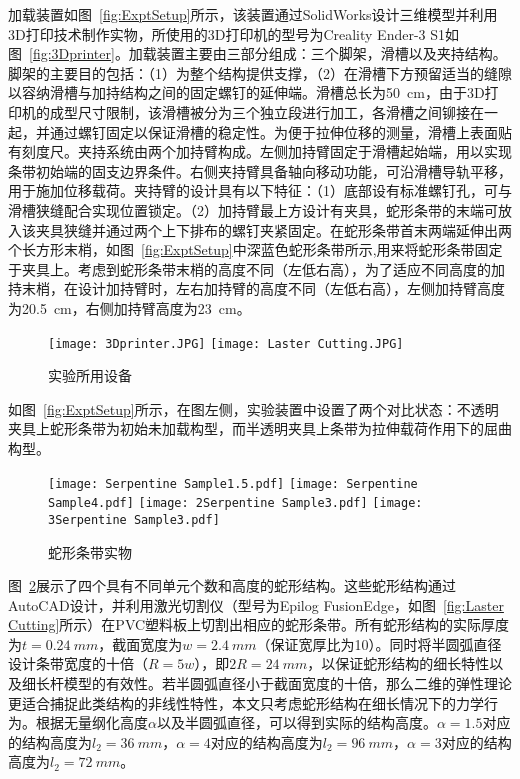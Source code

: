 加载装置如图~\ref{fig:ExptSetup}所示，该装置通过SolidWorks设计三维模型并利用3D打印技术制作实物，所使用的3D打印机的型号为Creality Ender-3 S1如图~\ref{fig:3Dprinter}。加载装置主要由三部分组成：三个脚架，滑槽以及夹持结构。脚架的主要目的包括：（1）为整个结构提供支撑，（2）在滑槽下方预留适当的缝隙以容纳滑槽与加持结构之间的固定螺钉的延伸端。滑槽总长为\SI{50}{cm}，由于3D打印机的成型尺寸限制，该滑槽被分为三个独立段进行加工，各滑槽之间铆接在一起，并通过螺钉固定以保证滑槽的稳定性。为便于拉伸位移的测量，滑槽上表面贴有刻度尺。夹持系统由两个加持臂构成。左侧加持臂固定于滑槽起始端，用以实现条带初始端的固支边界条件。右侧夹持臂具备轴向移动功能，可沿滑槽导轨平移，用于施加位移载荷。夹持臂的设计具有以下特征：（1）底部设有标准螺钉孔，可与滑槽狭缝配合实现位置锁定。（2）加持臂最上方设计有夹具，蛇形条带的末端可放入该夹具狭缝并通过两个上下排布的螺钉夹紧固定。在蛇形条带首末两端延伸出两个长方形末梢，如图~\ref{fig:ExptSetup}中深蓝色蛇形条带所示,用来将蛇形条带固定于夹具上。考虑到蛇形条带末梢的高度不同（左低右高），为了适应不同高度的加持末梢，在设计加持臂时，左右加持臂的高度不同（左低右高），左侧加持臂高度为\SI{20.5}{cm}，右侧加持臂高度为\SI{23}{cm}。
\begin{figure}
	\centering
	{\texttt{[image: 3Dprinter.JPG]}}
	{\texttt{[image: Laster Cutting.JPG]}}
	\caption{实验所用设备}
	\label{fig:experimental device}
\end{figure}

如图~\ref{fig:ExptSetup}所示，在图左侧，实验装置中设置了两个对比状态：不透明夹具上蛇形条带为初始未加载构型，而半透明夹具上条带为拉伸载荷作用下的屈曲构型。
\begin{figure}
	\centering
	{\texttt{[image: Serpentine Sample1.5.pdf]}}
	{\texttt{[image: Serpentine Sample4.pdf]}}
	{\texttt{[image: 2Serpentine Sample3.pdf]}}
    {\texttt{[image: 3Serpentine Sample3.pdf]}}
	\caption{蛇形条带实物}
	\label{fig:Samples of serpentine}
\end{figure}

图~\ref{fig:Samples of serpentine}展示了四个具有不同单元个数和高度的蛇形结构。这些蛇形结构通过AutoCAD设计，并利用激光切割仪（型号为Epilog FusionEdge，如图~\ref{fig:Laster Cutting}所示）在PVC塑料板上切割出相应的蛇形条带。所有蛇形结构的实际厚度为$t=\SI{0.24}{mm}$，截面宽度为$w=\SI{2.4}{mm}$（保证宽厚比为10）。同时将半圆弧直径设计条带宽度的十倍（$R=5w$），即$2R=\SI{24}{mm}$，以保证蛇形结构的细长特性以及细长杆模型的有效性。若半圆弧直径小于截面宽度的十倍，那么二维的弹性理论\cite{wang2023substantial,yang2017elasticity}更适合捕捉此类结构的非线性特性，本文只考虑蛇形结构在细长情况下的力学行为。根据无量纲化高度$\alpha$以及半圆弧直径，可以得到实际的结构高度。$\alpha=1.5$对应的结构高度为$l_2=\SI{36}{mm}$，$\alpha=4$对应的结构高度为$l_2=\SI{96}{mm}$，$\alpha=3$对应的结构高度为$l_2=\SI{72}{mm}$。



